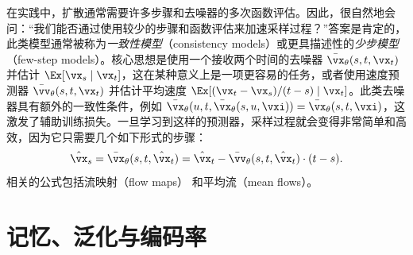 \documentclass[../../book-main_zh.tex]{subfiles}
\begin{document}
\begin{remark}
    在实践中，扩散通常需要许多步骤和去噪器的多次函数评估。因此，很自然地会问：“我们能否通过使用较少的步骤和函数评估来加速采样过程？”答案是肯定的，此类模型通常被称为\textit{一致性模型}（consistency models）或更具描述性的\textit{少步模型}（few-step models）。核心思想是使用一个接收两个时间的去噪器 \(\bar{\vx}_{\theta}(s, t,
    \vx_{t})\) 并估计 \(\Ex[\vx_{s} \mid \vx_{t}]\)，这在某种意义上是一项更容易的任务，或者使用速度预测器
    \(\bar{\vv}_{\theta}(s, t, \vx_{t})\) 并估计平均速度 \(\Ex[(\vx_{t} - \vx_{s})/(t - s) \mid \vx_{t}]\)。此类去噪器具有额外的一致性条件，例如 \(\bar{\vx}_{\theta}(u, t,
    \bar{\vx}_{\theta}(s, u, \vxi)) = \bar{\vx}_{\theta}(s, t, \vxi)\)，这激发了辅助训练损失。一旦学习到这样的预测器，采样过程就会变得非常简单和高效，因为它只需要几个如下形式的步骤：
    \begin{equation}
        \hat{\vx}_{s} = \bar{\vx}_{\theta}(s, t, \hat{\vx}_{t}) =
        \hat{\vx}_{t} - \bar{\vv}_{\theta}(s, t, \hat{\vx}_{t})\cdot(t - s).
    \end{equation}
    相关的公式包括流映射（flow maps）\cite{boffi2025build} 和平均流（mean flows）\cite{geng2025mean}。
\end{remark}

\section{记忆、泛化与编码率}
\label{sec:diffusion_memorization}
\end{document}
